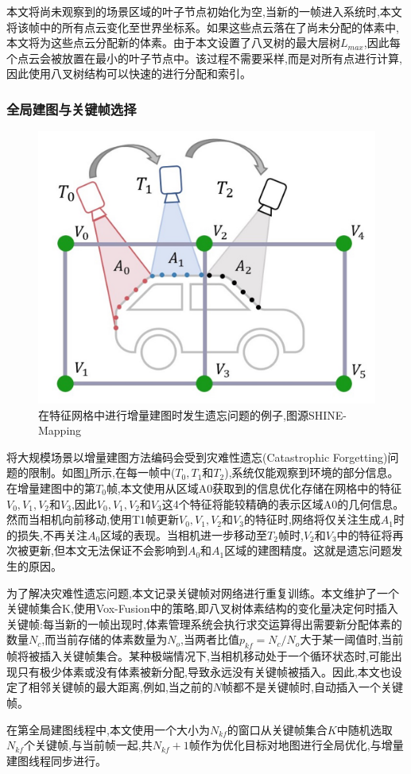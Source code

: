 本文将尚未观察到的场景区域的叶子节点初始化为空,当新的一帧进入系统时,本文将该帧中的所有点云变化至世界坐标系。如果这些点云落在了尚未分配的体素中,本文将为这些点云分配新的体素。由于本文设置了八叉树的最大层树$L_{max}$,因此每个点云会被放置在最小的叶子节点中。该过程不需要采样,而是对所有点进行计算,因此使用八叉树结构可以快速的进行分配和索引。
\subsubsection{全局建图与关键帧选择}
\begin{figure}[htbp]
    \includegraphics[scale = 0.2]{figures/forgetting.jpg}
    \centering
    \caption{在特征网格中进行增量建图时发生遗忘问题的例子,图源SHINE-Mapping\cite{shine}} \label{forgetting}
\end{figure}
将大规模场景以增量建图方法编码会受到灾难性遗忘(Catastrophic Forgetting)问题的限制。如图\ref{forgetting}所示,在每一帧中($T_0, T_1$和$T_2$),系统仅能观察到环境的部分信息。在增量建图中的第$T_0$帧,本文使用从区域A0获取到的信息优化存储在网格中的特征$V_0, V_1, V_2$和$V_3$,因此$V_0, V_1, V_2$和$V_3$这4个特征将能较精确的表示区域A0的几何信息。然而当相机向前移动,使用T1帧更新$V_0, V_1, V_2$和$V_3$的特征时,网络将仅关注生成$A_1$时的损失,不再关注$A_0$区域的表现。当相机进一步移动至$T_2$帧时,$V_2$和$V_3$中的特征将再次被更新,但本文无法保证不会影响到$A_0$和$A_1$区域的建图精度。这就是遗忘问题发生的原因。

为了解决灾难性遗忘问题,本文记录关键帧对网络进行重复训练。本文维护了一个关键帧集合K,使用Vox-Fusion中的策略,即八叉树体素结构的变化量决定何时插入关键帧:每当新的一帧出现时,体素管理系统会执行求交运算得出需要新分配体素的数量$N_c$,而当前存储的体素数量为$N_o$,当两者比值$p_{kf}=N_c/N_o$大于某一阈值时,当前帧将被插入关键帧集合。某种极端情况下,当相机移动处于一个循环状态时,可能出现只有极少体素或没有体素被新分配,导致永远没有关键帧被插入。因此,本文也设定了相邻关键帧的最大距离,例如,当之前的$N$帧都不是关键帧时,自动插入一个关键帧。

在第全局建图线程中,本文使用一个大小为$N_{kf}$的窗口从关键帧集合$K$中随机选取$N_{kf}$个关键帧,与当前帧一起,共$N_{kf}+1$帧作为优化目标对地图进行全局优化,与增量建图线程同步进行。
